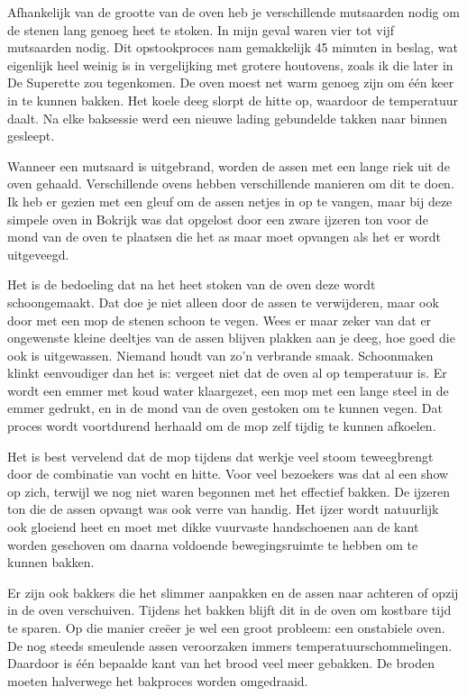 \documentclass[
  11pt,
  dutch,
]{memoir}
\begin{document}
Afhankelijk van de grootte van de oven heb je verschillende mutsaarden
nodig om de stenen lang genoeg heet te stoken. In mijn geval waren vier
tot vijf \mbox{mutsaarden} nodig. Dit opstookproces nam gemakkelijk 45
minuten in beslag, wat eigenlijk heel weinig is in vergelijking met
grotere houtovens, zoals ik die later in De Superette zou tegenkomen. De
oven moest net warm genoeg zijn om één keer in te kunnen bakken. Het
koele deeg slorpt de hitte op, waardoor de temperatuur daalt. Na elke
baksessie werd een nieuwe lading gebundelde takken naar binnen gesleept.

Wanneer een mutsaard is uitgebrand, worden de assen met een lange riek
uit de oven gehaald. Verschillende ovens hebben verschillende manieren
om dit te doen. Ik heb er gezien met een gleuf om de assen netjes in op
te vangen, maar bij deze simpele oven in Bokrijk was dat opgelost door
een zware ijzeren ton voor de mond van de oven te plaatsen die het as
maar moet opvangen als het er wordt uitgeveegd.

Het is de bedoeling dat na het heet stoken van de oven deze wordt
schoongemaakt. Dat doe je niet alleen door de assen te verwijderen, maar
ook door met een mop de stenen schoon te vegen. Wees er maar zeker van
dat er ongewenste kleine deeltjes van de assen blijven plakken aan je
deeg, hoe goed die ook is uitgewassen. Niemand houdt van zo'n verbrande
smaak. Schoonmaken klinkt eenvoudiger dan het is: vergeet niet dat de
oven al op temperatuur is. Er wordt een emmer met koud water klaargezet,
een mop met een lange steel in de emmer gedrukt, en in de mond van de
oven gestoken om te kunnen vegen. Dat proces wordt voortdurend herhaald
om de mop zelf tijdig te kunnen afkoelen.

Het is best vervelend dat de mop tijdens dat werkje veel stoom
teweegbrengt door de combinatie van vocht en hitte. Voor veel bezoekers
was dat al een show op zich, terwijl we nog niet waren begonnen met het
effectief bakken. De ijzeren ton die de assen opvangt was ook verre van
handig. Het ijzer wordt natuurlijk ook gloeiend heet en moet met dikke
vuurvaste handschoenen aan de kant worden geschoven om daarna voldoende
bewegingsruimte te hebben om te kunnen bakken.

Er zijn ook bakkers die het slimmer aanpakken en de assen naar achteren
of opzij in de oven verschuiven. Tijdens het bakken blijft dit in de
oven om kostbare tijd te sparen. Op die manier creëer je wel een groot
probleem: een onstabiele oven. De nog steeds smeulende assen veroorzaken
immers temperatuurschommelingen. Daardoor is één bepaalde kant van het
brood veel meer gebakken. De broden moeten halverwege het bakproces
worden omgedraaid.
\end{document}
